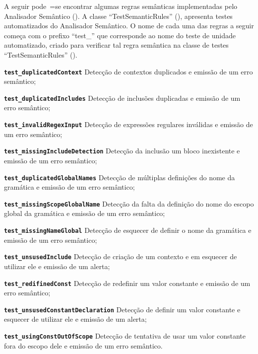 A seguir pode~=se encontrar algumas regras semânticas implementadas pelo Analisador Semântico ().
A classe ``TestSemanticRules'' (),
apresenta testes automatizados do Analisador Semântico.
O nome de cada uma das regras a seguir começa com o prefixo ``test\_'' que corresponde ao nome do teste de unidade automatizado,
criado para verificar tal regra semântica na classe de testes ``TestSemanticRules'' ().
\begin{enumerateoptional}[1)]
    \item[\bfseries\texttt{test_duplicatedContext}] Detecção de contextos duplicados e
    emissão de um erro semântico;

    \item[\bfseries\texttt{test_duplicatedIncludes}] Detecção de inclusões duplicadas  e
    emissão de um erro semântico;

    \item[\bfseries\texttt{test_invalidRegexInput}] Detecção de expressões regulares inválidas e
    emissão de um erro semântico;

    \item[\bfseries\texttt{test_missingIncludeDetection}] Detecção da inclusão um bloco inexistente e
    emissão de um erro semântico;

    \item[\bfseries\texttt{test_duplicatedGlobalNames}] Detecção de múltiplas definições do nome da gramática e
    emissão de um erro semântico;

    \item[\bfseries\texttt{test_missingScopeGlobalName}] Detecção da falta da definição do nome do escopo global da gramática e
    emissão de um erro semântico;

    \item[\bfseries\texttt{test_missingNameGlobal}] Detecção de esquecer de definir o nome da gramática e
    emissão de um erro semântico;

    \item[\bfseries\texttt{test_unsusedInclude}] Detecção de criação de um contexto e
    em esquecer de utilizar ele e
    emissão de um alerta;

    \item[\bfseries\texttt{test_redifinedConst}] Detecção de redefinir um valor constante e
    emissão de um erro semântico;

    \item[\bfseries\texttt{test_unsusedConstantDeclaration}] Detecção de definir um valor constante e esquecer de utilizar ele e
    emissão de um alerta;

    \item[\bfseries\texttt{test_usingConstOutOfScope}] Detecção de tentativa de usar um valor constante fora do escopo dele e
    emissão de um erro semântico.
\end{enumerateoptional}%
